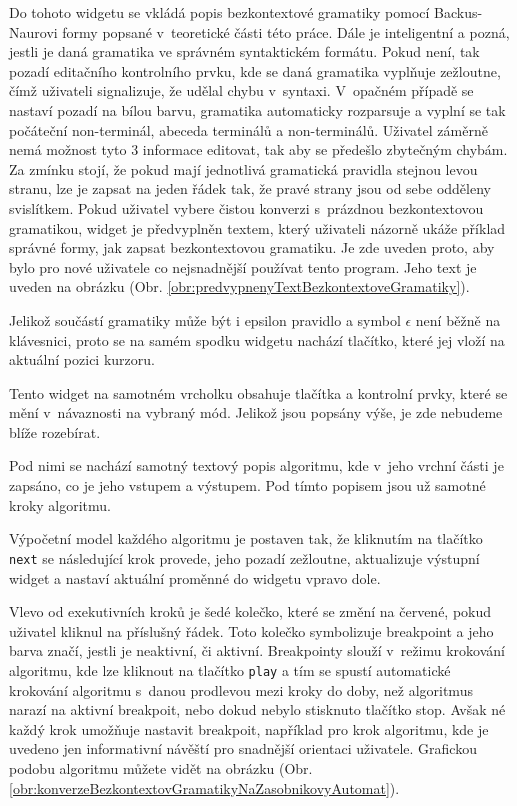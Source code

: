 Do tohoto widgetu se vkládá popis bezkontextové gramatiky pomocí Backus-Naurovi formy popsané v~teoretické části této práce. Dále je inteligentní a pozná, jestli je daná gramatika ve správném syntaktickém formátu. Pokud není, tak pozadí editačního kontrolního prvku, kde se daná gramatika vyplňuje zežloutne, čímž uživateli signalizuje, že udělal chybu v~syntaxi. V~opačném případě se nastaví pozadí na bílou barvu, gramatika automaticky rozparsuje a vyplní se tak počáteční non-terminál, abeceda terminálů a non-terminálů. Uživatel záměrně nemá možnost tyto 3 informace editovat, tak aby se předešlo zbytečným chybám. Za zmínku stojí, že pokud mají jednotlivá gramatická pravidla stejnou levou stranu, lze je zapsat na jeden řádek tak, že pravé strany jsou od sebe odděleny svislítkem. Pokud uživatel vybere čistou konverzi s~prázdnou bezkontextovou gramatikou, widget je předvyplněn textem, který uživateli názorně ukáže příklad správné formy, jak zapsat bezkontextovou gramatiku. Je zde uveden proto, aby bylo pro nové uživatele co nejsnadnější používat tento program. Jeho text je uveden na obrázku (Obr. \ref{obr:predvypnenyTextBezkontextoveGramatiky}). 

Jelikož součástí gramatiky může být i epsilon pravidlo a symbol $\epsilon$ není běžně na klávesnici, proto se na samém spodku widgetu nachází tlačítko, které jej vloží na aktuální pozici kurzoru.  



Tento widget na samotném vrcholku obsahuje tlačítka a kontrolní prvky, které se mění v~návaznosti na vybraný mód. Jelikož jsou popsány výše, je zde nebudeme blíže rozebírat.

Pod nimi se nachází samotný textový popis algoritmu, kde v~jeho vrchní části je zapsáno, co je jeho vstupem a výstupem. Pod tímto popisem jsou už samotné kroky algoritmu.

Výpočetní model každého algoritmu je postaven tak, že kliknutím na tlačítko \texttt{next} se následující krok provede, jeho pozadí zežloutne, aktualizuje výstupní widget a nastaví aktuální proměnné do widgetu vpravo dole. 

Vlevo od exekutivních kroků je šedé kolečko, které se změní na červené, pokud uživatel kliknul na příslušný řádek. Toto kolečko symbolizuje breakpoint a jeho barva značí, jestli je neaktivní, či aktivní. Breakpointy slouží v~režimu krokování algoritmu, kde lze kliknout na tlačítko \texttt{play} a tím se spustí automatické krokování algoritmu s~danou prodlevou mezi kroky do doby, než algoritmus narazí na aktivní breakpoit, nebo dokud nebylo stisknuto tlačítko stop. Avšak né každý krok umožňuje nastavit breakpoit, například pro krok algoritmu, kde je uvedeno jen informativní návěští pro snadnější orientaci uživatele. Grafickou podobu algoritmu můžete vidět na obrázku (Obr. \ref{obr:konverzeBezkontextovGramatikyNaZasobnikovyAutomat}).

